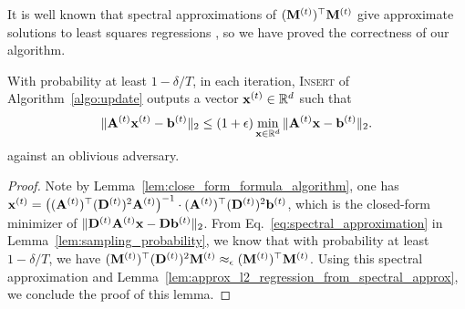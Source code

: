 





It is well known that spectral approximations of $(\mathbf{M}^{(t)})^{\top} \mathbf{M}^{(t)}$ give approximate solutions to least squares regressions \cite{w14}, so we have proved the correctness of our algorithm.
\begin{lemma}\label{lem:correctness_algorithm}
With probability at least $1 - \delta/T$, in each iteration, \textsc{Insert} of Algorithm~\ref{algo:update} outputs a vector $\mathbf{x}^{(t)} \in \mathbb{R}^d$ such that 
    \[
    \|\mathbf{A}^{(t)} \mathbf{x}^{(t)} - \mathbf{b}^{(t)}\|_2 \leq (1+\epsilon) \min_{\mathbf{x} \in \mathbb{R}^d} \|\mathbf{A}^{(t)} \mathbf{x} - \mathbf{b}^{(t)} \|_2.
    \]
against an oblivious adversary.
\end{lemma}
\begin{proof}
Note by Lemma~\ref{lem:close_form_formula_algorithm}, one has $\mathbf{x}^{(t)} = \big( (\mathbf{A}^{(t)})^{\top} (\mathbf{D}^{(t)})^2 \mathbf{A}^{(t)} \big)^{-1} \cdot (\mathbf{A}^{(t)})^{\top} (\mathbf{D}^{(t)})^2 \mathbf{b}^{(t)}$, which is the closed-form minimizer of $\|\mathbf{D}^{(t)} \mathbf{A}^{(t)} \mathbf{x} - \mathbf{D} \mathbf{b}^{(t)}\|_2$.
From Eq.~\eqref{eq:spectral_approximation} in Lemma~\ref{lem:sampling_probability}, we know that with probability at least $1 - \delta/T$, we have $(\mathbf{M}^{(t)})^{\top} (\mathbf{D}^{(t)})^2 \mathbf{M}^{(t)} \approx_{\epsilon} (\mathbf{M}^{(t)})^{\top} \mathbf{M}^{(t)}$. 
Using this spectral approximation and Lemma~\ref{lem:approx_l2_regression_from_spectral_approx}, we conclude the proof of this lemma.
\end{proof}




